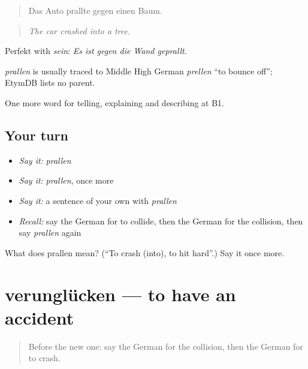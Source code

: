 \begin{quote}
Das Auto prallte gegen einen Baum.
\end{quote}

\begin{quote}
\emph{The car crashed into a tree.}
\end{quote}

Perfekt with \emph{sein}: \emph{Es ist gegen die Wand geprallt}.

\begin{cousinweb}
\emph{prallen} is usually traced to Middle High German \emph{prellen} \textquotedblleft{}to bounce off\textquotedblright{}; EtymDB lists no parent.
\end{cousinweb}

\begin{grammarlens}[title={What you've built}]
One more word for telling, explaining and describing at B1.
\end{grammarlens}

\subsection*{Your turn}
\begin{itemize}
\raggedright
  \item \emph{Say it:} \emph{prallen}
  \item \emph{Say it:} \emph{prallen}, once more
  \item \emph{Say it:} a sentence of your own with \emph{prallen}
  \item \emph{Recall:} say the German for to collide, then the German for the collision, then say \emph{prallen} again
\end{itemize}

\begin{tcolorbox}[breakable,colback=teal!4,colframe=teal!35!black,title={Before you move on}]
What does prallen mean? (\textquotedblleft{}To crash (into), to hit hard\textquotedblright{}.) Say it once more.
\end{tcolorbox}
\section[verunglücken]{verunglücken — to have an accident}

\label{lesson:GE-C288-verungluecken}



\begin{quote}
Before the new one: say the German for the collision, then the German for to crash.
\end{quote}

